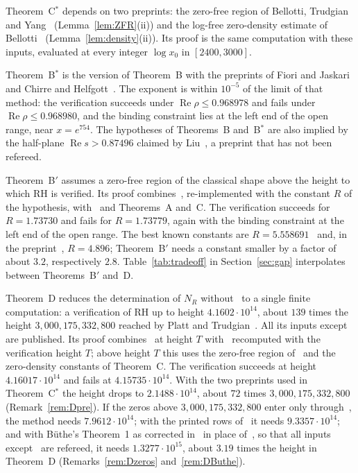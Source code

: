 \documentclass{amsart}
\theoremstyle{definition}
\theoremstyle{remark}
\theoremstyle{plain}
\numberwithin{equation}{section}
\newcommand{\HRH}{3{,}000{,}175{,}332{,}800}
\newcommand{\TB}{1.3277\cdot10^{15}}
\newcommand{\TDhyp}{4.1602\cdot10^{14}}
\newcommand{\TDuse}{4.16017\cdot10^{14}}
\newcommand{\TDpre}{2.1488\cdot10^{14}}
\newcommand{\TDold}{9.3357\cdot10^{14}}
\newcommand{\Cstar}{C$^*$}
\newcommand{\Bp}{B$'$}
\newcommand{\Bstar}{B$^*$}
\begin{document}
Theorem~\Cstar{} depends on two preprints: the zero-free region of Bellotti, Trudgian and Yang~\cite{BTY26} (Lemma~\ref{lem:ZFR}(ii)) and the log-free zero-density estimate of Bellotti~\cite{Bel24} (Lemma~\ref{lem:density}(ii)). Its proof is the same computation with these inputs, evaluated at every integer $\log x_0$ in $[2400,3000]$.

Theorem~\Bstar{} is the version of Theorem~B with the preprints of Fiori and Jaskari~\cite{FJ26} and Chirre and Helfgott~\cite{CH25}. The exponent is within $10^{-5}$ of the limit of that method: the verification succeeds under $\operatorname{Re}\rho\le0.968978$ and fails under $\operatorname{Re}\rho\le0.968980$, and the binding constraint lies at the left end of the open range, near $x=e^{754}$. The hypotheses of Theorems~B and~\Bstar{} are also implied by the half-plane $\operatorname{Re}s>0.87496$ claimed by Liu~\cite{Liu26}, a preprint that has not been refereed.

Theorem~\Bp{} assumes a zero-free region of the classical shape above the height to which RH is verified. Its proof combines~\cite[Thm.~1.1]{FKS23}, re-implemented with the constant $R$ of the hypothesis, with~\cite[Cor.~1.3]{CH25} and Theorems~A and~C. The verification succeeds for $R=1.73730$ and fails for $R=1.73779$, again with the binding constraint at the left end of the open range. The best known constants are $R=5.558691$~\cite{MTY23} and, in the preprint~\cite{BTY26}, $R=4.896$; Theorem~\Bp{} needs a constant smaller by a factor of about $3.2$, respectively $2.8$. Table~\ref{tab:tradeoff} in Section~\ref{sec:gap} interpolates between Theorems~\Bp{} and~D.

Theorem~D reduces the determination of $N_R$ without~\cite{OAI26} to a single finite computation: a verification of RH up to height $\TDhyp$, about $139$ times the height $\HRH$ reached by Platt and Trudgian~\cite{PT21a}. All its inputs except~\cite{CH25} are published. Its proof combines~\cite[Prop.~9.1]{CH25} at height $T$ with~\cite[Thm.~1.1]{FKS23} recomputed with the verification height $T$; above height $T$ this uses the zero-free region of~\cite{MTY23} and the zero-density constants of Theorem~C. The verification succeeds at height $\TDuse$ and fails at $4.15735\cdot10^{14}$. With the two preprints used in Theorem~\Cstar{} the height drops to $\TDpre$, about $72$ times $\HRH$ (Remark~\ref{rem:Dpre}). If the zeros above $\HRH$ enter only through~\cite[Prop.~9.1]{CH25}, the method needs $7.9612\cdot10^{14}$; with the printed rows of~\cite{FKS23} it needs $\TDold$; and with B\"uthe's Theorem~1 as corrected in~\cite{Bha24} in place of~\cite{CH25}, so that all inputs except~\cite{Bha24} are refereed, it needs $\TB$, about $3.19$ times the height in Theorem~D (Remarks~\ref{rem:Dzeros} and~\ref{rem:DButhe}).
\end{document}
